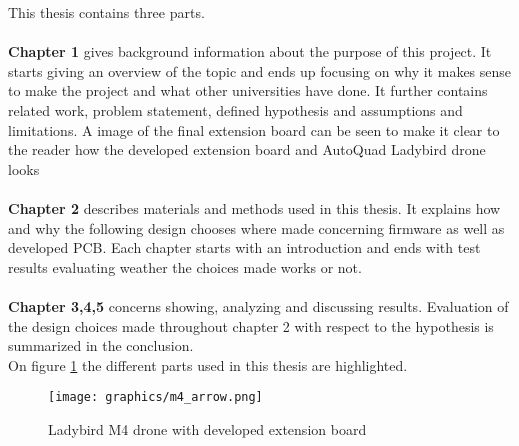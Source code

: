 This thesis contains three parts.\\ \\
\textbf{Chapter 1} gives background information about the purpose of this project. It starts giving an overview of the topic and ends up focusing on why it makes sense to make the project and what other universities have done. It further contains related work,  problem statement, defined hypothesis and assumptions and limitations. A image of the final extension board can be seen to make it clear to the reader how the developed extension board and AutoQuad Ladybird drone looks\\ \\
\textbf{Chapter 2} describes materials and methods used in this thesis. It explains how and why the following design chooses where made concerning firmware as well as developed PCB. Each chapter starts with an introduction and ends with test results evaluating weather the choices made works or not.\\ \\
\textbf{Chapter 3,4,5} concerns showing, analyzing and discussing results. Evaluation of the design choices made throughout chapter 2 with respect to the hypothesis is summarized in the conclusion. \\


On figure \ref{fig:drone_with_arrows} the different parts used in this thesis are highlighted.

\begin{figure}[H]
    \center
    \texttt{[image: graphics/m4\_arrow.png]}
  \caption{Ladybird M4 drone with developed extension board}
  \label{fig:drone_with_arrows}
\end{figure}


